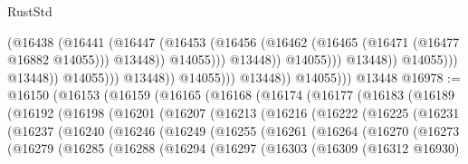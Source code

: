 \begin{lexlean}{RustStd}
\begin{coremodule}
                                                    (@16438
                                                      (@16441
                                                        (@16447
                                                          (@16453
                                                            (@16456
                                                              (@16462
                                                                (@16465
                                                                  (@16471 (@16477 @16882 @14055)))
                                                                @13448))
                                                            @14055)))
                                                      @13448))
                                                  @14055)))
                                            @13448))
                                        @14055)))
                                  @13448))
                              @14055)))
                        @13448))
                    @14055)))
              @13448))
          @14055)))
    @13448
@16978 := @16150
    (@16153
      (@16159
        (@16165
          (@16168
            (@16174
              (@16177
                (@16183
                  (@16189
                    (@16192
                      (@16198
                        (@16201
                          (@16207
                            (@16213
                              (@16216
                                (@16222
                                  (@16225
                                    (@16231
                                      (@16237
                                        (@16240
                                          (@16246
                                            (@16249
                                              (@16255
                                                (@16261
                                                  (@16264
                                                    (@16270
                                                      (@16273
                                                        (@16279
                                                          (@16285
                                                            (@16288
                                                              (@16294
                                                                (@16297
                                                                  (@16303
                                                                    (@16309
                                                                      (@16312 @16930)

\end{coremodule}
\end{lexlean}
